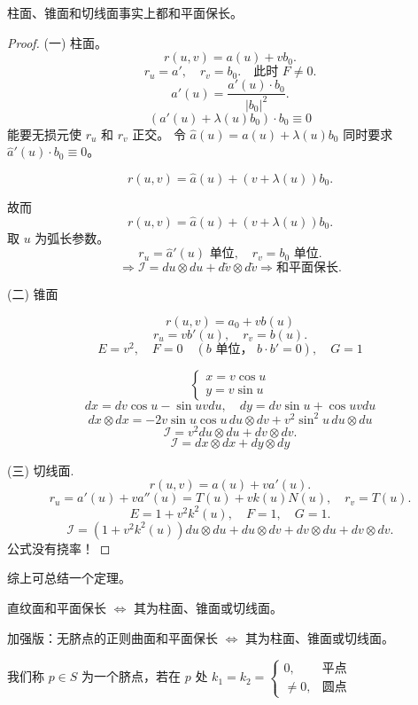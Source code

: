 \documentclass[lang=cn,10pt,thmcnt=section]{elegantbook}
\begin{document}
\begin{proposition}
    柱面、锥面和切线面事实上都和平面保长。
\end{proposition}
\begin{proof}
    (一) 柱面。
\[
r(u,v) = a(u) + v b_0.
\]
\[
r_u = a', \quad r_v = b_0. \quad \text{此时 } F \neq 0.
\]
\[
a'(u) = \frac{a'(u) \cdot b_0}{|b_0|^2}.
\]
\[
(a'(u) + \lambda(u) b_0) \cdot b_0 \equiv 0
\]
能要无损元使 \(r_u\) 和 \(r_v\) 正交。
令 \(\widehat{a}(u) = a(u) + \lambda(u) b_0\) 同时要求 \(\widehat{a}'(u) \cdot b_0 \equiv 0\)。

\[
r(u,v) = \widehat{a}(u) + (v + \lambda(u)) b_0.
\]

故而
\[
r(u,v) = \widehat{a}(u) + (v + \lambda(u)) b_0.
\]
取 \(u\) 为弧长参数。
\[
r_u = \widehat{a}'(u) \text{ 单位}, \quad r_v = b_0 \text{ 单位}.
\]
\[
\Rightarrow \mathcal{I} = du \otimes du + d\widetilde{v} \otimes d\widetilde{v} \Rightarrow \text{和平面保长}.
\]

(二) 锥面

\[
r(u,v) = a_0 + v b(u)
\]
\[
r_u = v b'(u), \quad r_v = b(u).
\]
\[
E = v^2, \quad F = 0 \quad (b \text{ 单位， } b \cdot b' = 0), \quad G = 1
\]

\[
\begin{cases}
x = v \cos u \\
y = v \sin u
\end{cases}
\]
\[
dx = dv \cos u - \sin u v du, \quad dy = dv \sin u + \cos u v du
\]
\[
dx \otimes dx = -2v \sin u \cos u \, du \otimes dv + v^2 \sin^2 u \, du \otimes du
\]
\[
\mathcal{I} = v^2 du \otimes du + dv \otimes dv.
\]
\[
\mathcal{I} = dx \otimes dx + dy \otimes dy
\]

(三) 切线面.
\[
r(u,v) = a(u) + v a'(u).
\]
\[
r_u = a'(u) + v a''(u) = T(u) + v k(u) N(u), \quad r_v = T(u).
\]
\[
E = 1 + v^2 k^2(u), \quad F = 1, \quad G = 1.
\]
\[
\mathcal{I} = (1 + v^2 k^2(u)) du \otimes du + du \otimes dv + dv \otimes du + dv \otimes dv.
\]
公式没有挠率！

\end{proof}
综上可总结一个定理。
\begin{theorem}
    直纹面和平面保长 $\Leftrightarrow$ 其为柱面、锥面或切线面。

加强版：无脐点的正则曲面和平面保长 $\Leftrightarrow$ 其为柱面、锥面或切线面。
\end{theorem}

\begin{definition}[脐点]
    我们称 $p \in S$ 为一个脐点，若在 $p$ 处 $k_1 = k_2 = \begin{cases} 
        0, & \text{平点} \\
        \neq 0, & \text{圆点}
        \end{cases}$
\end{definition}
\end{document}
